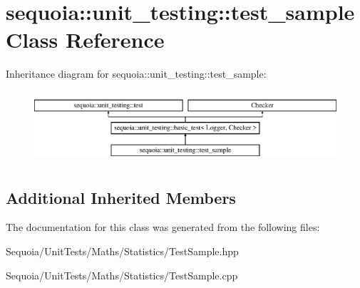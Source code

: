 \hypertarget{classsequoia_1_1unit__testing_1_1test__sample}{}\section{sequoia\+::unit\+\_\+testing\+::test\+\_\+sample Class Reference}
\label{classsequoia_1_1unit__testing_1_1test__sample}
Inheritance diagram for sequoia\+::unit\+\_\+testing\+::test\+\_\+sample\+:\begin{figure}[H]
\begin{center}
\leavevmode
\includegraphics[height=2.666667cm]{classsequoia_1_1unit__testing_1_1test__sample}
\end{center}
\end{figure}
\subsection*{Additional Inherited Members}


The documentation for this class was generated from the following files\+:\begin{DoxyCompactItemize}
\item 
Sequoia/\+Unit\+Tests/\+Maths/\+Statistics/Test\+Sample.\+hpp\item 
Sequoia/\+Unit\+Tests/\+Maths/\+Statistics/Test\+Sample.\+cpp\end{DoxyCompactItemize}
